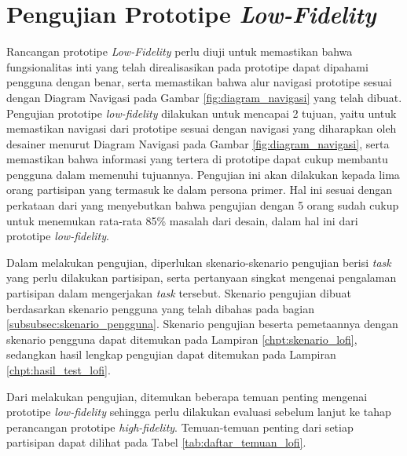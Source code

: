 \section{Pengujian Prototipe \textit{Low-Fidelity}}
Rancangan prototipe \textit{Low-Fidelity} perlu diuji untuk memastikan bahwa fungsionalitas inti yang telah direalisasikan pada prototipe dapat dipahami pengguna dengan benar, serta memastikan bahwa alur navigasi prototipe sesuai dengan Diagram Navigasi pada Gambar \ref{fig:diagram_navigasi} yang telah dibuat. Pengujian prototipe \textit{low-fidelity} dilakukan untuk mencapai 2 tujuan, yaitu untuk memastikan navigasi dari prototipe sesuai dengan navigasi yang diharapkan oleh desainer menurut Diagram Navigasi pada Gambar \ref{fig:diagram_navigasi}, serta memastikan bahwa informasi yang tertera di prototipe dapat cukup membantu pengguna dalam memenuhi tujuannya. Pengujian ini akan dilakukan kepada lima orang partisipan yang termasuk ke dalam persona primer. Hal ini sesuai dengan perkataan dari \textcite{nielsenusabilityproblems} yang menyebutkan bahwa pengujian dengan 5 orang sudah cukup untuk menemukan rata-rata 85\% masalah dari desain, dalam hal ini dari prototipe \textit{low-fidelity}.



Dalam melakukan pengujian, diperlukan skenario-skenario pengujian berisi \textit{task} yang perlu dilakukan partisipan, serta pertanyaan singkat mengenai pengalaman partisipan dalam mengerjakan \textit{task} tersebut. Skenario pengujian dibuat berdasarkan skenario pengguna yang telah dibahas pada bagian \ref{subsubsec:skenario_pengguna}. Skenario pengujian beserta pemetaannya dengan skenario pengguna dapat ditemukan pada Lampiran \ref{chpt:skenario_lofi}, sedangkan hasil lengkap pengujian dapat ditemukan pada Lampiran \ref{chpt:hasil_test_lofi}.

Dari melakukan pengujian, ditemukan beberapa temuan penting mengenai prototipe \textit{low-fidelity} sehingga perlu dilakukan evaluasi sebelum lanjut ke tahap perancangan prototipe \textit{high-fidelity}. Temuan-temuan penting dari setiap partisipan dapat dilihat pada Tabel \ref{tab:daftar_temuan_lofi}.

